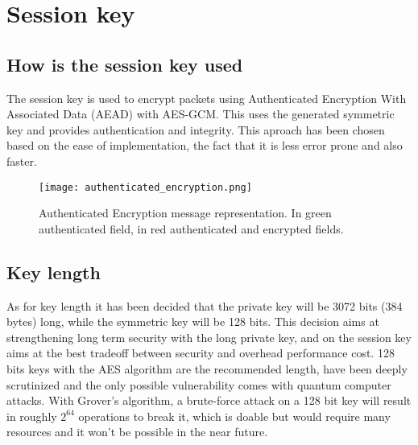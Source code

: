 \section{Session key}

\subsection{How is the session key used}

The session key is used to encrypt packets using Authenticated Encryption With Associated Data (AEAD) with AES-GCM. This uses the generated symmetric key and provides authentication and integrity. This aproach has been chosen based on the ease of implementation, the fact that it is less error prone and also faster. 

\begin{figure}[!h] 
    \centering 
    \texttt{[image: authenticated\_encryption.png]} 
    \caption{Authenticated Encryption message representation. In green authenticated field, in red authenticated and encrypted fields.}
    \label{fig:authenticated_encryption}
\end{figure}

\subsection{Key length}

As for key length it has been decided that the private key will be 3072 bits (384 bytes) long, while the symmetric key will be 128 bits. This decision aims at strengthening long term security with the long private key, and on the session key aims at the best tradeoff between security and overhead performance cost. 128 bits keys with the AES algorithm are the recommended length, have been deeply scrutinized and the only possible vulnerability comes with quantum computer attacks. With Grover's algorithm, a brute-force attack on a 128 bit key will result in roughly \(2^64\) operations to break it, which is doable but would require many resources and it won’t be possible in the near future.

